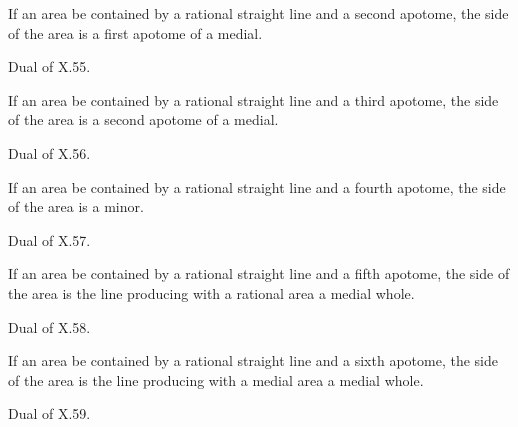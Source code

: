 \documentclass{rrxiv}
\begin{document}
\begin{claim}
\label{prop:X.92}
If an area be contained by a rational straight line and a second
apotome, the side of the area is a first apotome of a medial.
\end{claim}
\begin{evidence}[Proof of X.92]
\label{ev:X.92}
Dual of X.55.
\end{evidence}

\begin{claim}
\label{prop:X.93}
If an area be contained by a rational straight line and a third
apotome, the side of the area is a second apotome of a medial.
\end{claim}
\begin{evidence}[Proof of X.93]
\label{ev:X.93}
Dual of X.56.
\end{evidence}

\begin{claim}
\label{prop:X.94}
If an area be contained by a rational straight line and a fourth
apotome, the side of the area is a minor.
\end{claim}
\begin{evidence}[Proof of X.94]
\label{ev:X.94}
Dual of X.57.
\end{evidence}

\begin{claim}
\label{prop:X.95}
If an area be contained by a rational straight line and a fifth
apotome, the side of the area is the line producing with a rational
area a medial whole.
\end{claim}
\begin{evidence}[Proof of X.95]
\label{ev:X.95}
Dual of X.58.
\end{evidence}

\begin{claim}
\label{prop:X.96}
If an area be contained by a rational straight line and a sixth
apotome, the side of the area is the line producing with a medial
area a medial whole.
\end{claim}
\begin{evidence}[Proof of X.96]
\label{ev:X.96}
Dual of X.59.
\end{evidence}
\end{document}
